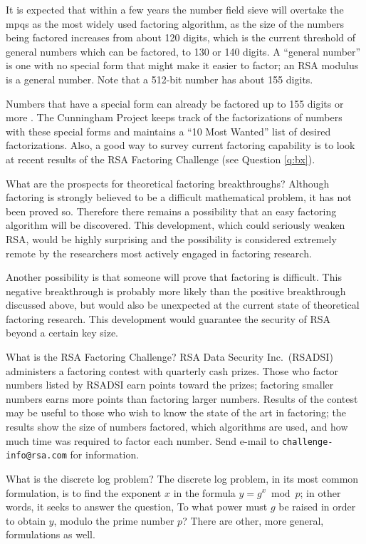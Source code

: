 It is expected that within a few years the number field sieve will overtake 
the mpqs as the most widely used factoring algorithm, as the size of the 
numbers being factored increases from about 120 digits, which is the current 
threshold of general numbers which can be factored, to 130 or 140 digits. A 
``general number'' is one with no special form that might make it easier to 
factor; an RSA modulus is a general number. Note that a 512-bit number has 
about 155 digits. 

Numbers that have a special form can already be factored up to 155 digits 
or more \cite{lenstra-f9}. The Cunningham Project 
\cite{brillhart-cunningham} keeps track of the factorizations of 
numbers with these special forms and maintains a ``10 Most Wanted'' list 
of desired factorizations. Also, a good way to survey current
factoring capability is to look at recent results of the RSA 
Factoring Challenge (see Question \ref{q:bx}).

{What are the prospects for theoretical factoring breakthroughs?}
Although factoring is strongly believed to be a difficult mathematical
problem, it has not been proved so. Therefore there remains a possibility 
that an easy factoring algorithm will be discovered. This development, which 
could seriously weaken RSA, would be highly surprising and the possibility 
is considered extremely remote by the researchers most actively engaged in 
factoring research. 

Another possibility is that someone will prove that factoring is difficult.
This negative breakthrough is probably more likely than the positive 
breakthrough discussed above, but would also be unexpected at the current 
state of theoretical factoring research. This development would guarantee 
the security of RSA beyond a certain key size.

{What is the RSA Factoring Challenge?}
RSA Data Security Inc.\ (RSADSI) administers a factoring contest with 
quarterly cash prizes. Those who factor numbers listed by RSADSI earn
points toward the prizes; factoring smaller numbers earns more points than
factoring larger numbers. Results of the contest may be useful to those who 
wish to know the state of the art in factoring; the results show the size 
of numbers factored, which algorithms are used, and how much time was 
required to factor each number. Send e-mail to \verb+challenge-info@rsa.com+ 
for information. 

{What is the discrete log problem?}
The discrete log problem, in its most common formulation, is to find
the exponent $x$ in the formula $y=g^x \bmod p$; in other words, it
seeks to answer the question, To what power must $g$ be raised in order
to obtain $y$, modulo the prime number $p$? There are other, more general,
formulations as well.

